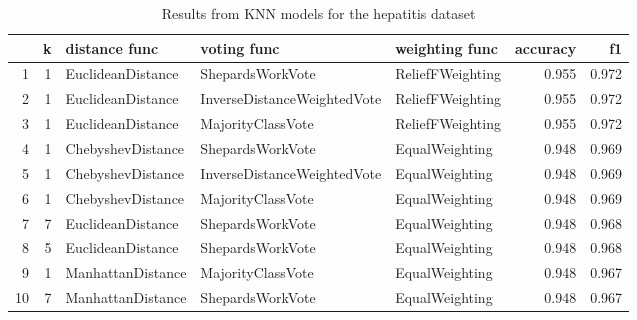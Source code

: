 \begin{table}
\centering
\caption{Results from KNN models for the hepatitis dataset}
\label{tab:knn_results_hepatitis}
\begin{tabular}{rrlllrr}
\toprule
 & k & distance func & voting func & weighting func & accuracy & f1 \\
\midrule
1 & 1 & EuclideanDistance & ShepardsWorkVote & ReliefFWeighting & 0.955 & 0.972 \\
2 & 1 & EuclideanDistance & InverseDistanceWeightedVote & ReliefFWeighting & 0.955 & 0.972 \\
3 & 1 & EuclideanDistance & MajorityClassVote & ReliefFWeighting & 0.955 & 0.972 \\
4 & 1 & ChebyshevDistance & ShepardsWorkVote & EqualWeighting & 0.948 & 0.969 \\
5 & 1 & ChebyshevDistance & InverseDistanceWeightedVote & EqualWeighting & 0.948 & 0.969 \\
6 & 1 & ChebyshevDistance & MajorityClassVote & EqualWeighting & 0.948 & 0.969 \\
7 & 7 & EuclideanDistance & ShepardsWorkVote & EqualWeighting & 0.948 & 0.968 \\
8 & 5 & EuclideanDistance & ShepardsWorkVote & EqualWeighting & 0.948 & 0.968 \\
9 & 1 & ManhattanDistance & MajorityClassVote & EqualWeighting & 0.948 & 0.967 \\
10 & 7 & ManhattanDistance & ShepardsWorkVote & EqualWeighting & 0.948 & 0.967 \\
\bottomrule
\end{tabular}
\end{table}
